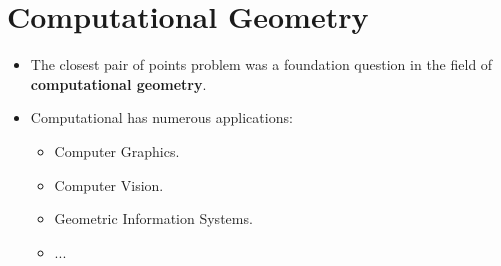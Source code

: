 \documentclass[12pt]{article}
\begin{document}
	
\section{Computational Geometry}
\renewcommand{\labelitemii}{$\circ$}
\renewcommand{\labelitemiii}{$\cdot$}
\renewcommand{\labelitemiii}{$\rightarrow$}
\renewcommand{\labelitemiv}{$\star$}
\begin{itemize}
\item The closest pair of points problem was a foundation question in the field of \textbf{computational geometry}.
\item Computational has numerous applications:
	\begin{itemize}
	\item Computer Graphics.
	\item Computer Vision.
	\item Geometric Information Systems.
	\item ...
	\end{itemize} 
\end{itemize} 	
	
	
	
	
	
	
	
	
	
\end{document}
